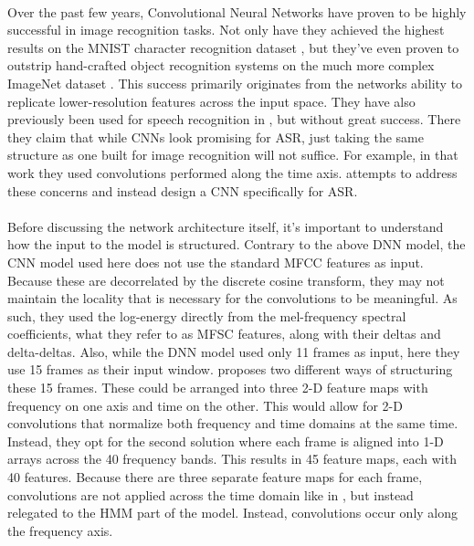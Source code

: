 \documentclass[letterpaper]{article}
\begin{document}
\paragraph{} Over the past few years, Convolutional Neural Networks have proven to be highly successful in image recognition tasks. Not only have they achieved the highest results on the MNIST character recognition dataset \cite{DBLP:journals/corr/abs-1003-0358}, but they've even proven to outstrip hand-crafted object recognition systems on the much more complex ImageNet dataset \cite{DBLP:conf/nips/KrizhevskySH12}. This success primarily originates from the networks ability to replicate lower-resolution features across the input space. They have also previously been used for speech recognition in \cite{hau2011exploring}, but without great success. There they claim that while CNNs look promising for ASR, just taking the same structure as one built for image recognition will not suffice. For example, in that work they used convolutions performed along the time axis. \cite{DBLP:journals/taslp/Abdel-HamidMJDPY14} attempts to address these concerns and instead design a CNN specifically for ASR.

\paragraph{} Before discussing the network architecture itself, it's important to understand how the input to the model is structured. Contrary to the above DNN model, the CNN model used here does not use the standard MFCC features as input. Because these are decorrelated by the discrete cosine transform, they may not maintain the locality that is necessary for the convolutions to be meaningful. As such, they used the log-energy directly from the mel-frequency spectral coefficients, what they refer to as MFSC features, along with their deltas and delta-deltas. Also, while the DNN model used only 11 frames as input, here they use 15 frames as their input window. \cite{DBLP:journals/taslp/Abdel-HamidMJDPY14} proposes two different ways of structuring these 15 frames. These could be arranged into three 2-D feature maps with frequency on one axis and time on the other. This would allow for 2-D convolutions that normalize both frequency and time domains at the same time. Instead, they opt for the second solution where each frame is aligned into 1-D arrays across the 40 frequency bands. This results in 45 feature maps, each with 40 features. Because there are three separate feature maps for each frame, convolutions are not applied across the time domain like in \cite{hau2011exploring}, but instead relegated to the HMM part of the model. Instead, convolutions occur only along the frequency axis.
\end{document}
